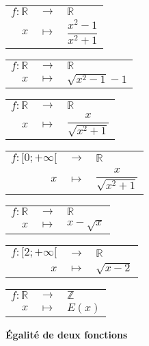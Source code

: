 \documentclass[12pt]{article}
\begin{document}
\noindent
\begin{multicols}{3}
\noindent
\renewcommand{\arraystretch}{1.3} %
\begin{tabular}{rcl}
    $f : \mathbb{R}$ & $\to$ & $\mathbb{R}$ \\
    $x$ & $\mapsto$ & $\dfrac{x^2 - 1}{x^2 + 1}$
\end{tabular}

\bigskip

\begin{tabular}{rcl}
    $f : \mathbb{R}$ & $\to$ & $\mathbb{R}$ \\
    $x$ & $\mapsto$ & $\sqrt{x^2 - 1} - 1$
\end{tabular}

\columnbreak

\begin{tabular}{rcl}
    $f : \mathbb{R}$ & $\to$ & $\mathbb{R}$ \\
    $x$ & $\mapsto$ & $\dfrac{x}{\sqrt{x^2+1}}$
\end{tabular}

\bigskip

\begin{tabular}{rcl}
    $f : [0; +\infty[$ & $\to$ & $\mathbb{R}$ \\
    $x$ & $\mapsto$ & $\dfrac{x}{\sqrt{x^2+1}}$
\end{tabular}

\columnbreak

\begin{tabular}{rcl}
    $f : \mathbb{R}$ & $\to$ & $\mathbb{R}$ \\
    $x$ & $\mapsto$ & $x - \sqrt{x}$
\end{tabular}

\bigskip

\begin{tabular}{rcl}
    $f : [2; +\infty[$ & $\to$ & $\mathbb{R}$ \\
    $x$ & $\mapsto$ & $\sqrt{x - 2}$
\end{tabular}

\bigskip

\begin{tabular}{rcl}
    $f : \mathbb{R}$ & $\to$ & $\mathbb{Z}$ \\
    $x$ & $\mapsto$ & $E(x)$
\end{tabular}

\end{multicols}

 \quad \textbf{Égalité de deux fonctions}
\end{document}
